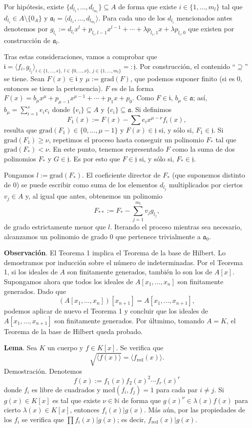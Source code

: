 \documentclass[a4paper,12pt]{article}
\newcommand{\N}{\mathbb{N}}
\newcommand{\af}{\mathfrak{a}}
\newcommand{\grad}{\text{grad}}
\begin{document}
Por hipótesis, existe $\{d_{l_1},\dots,d_{l_{m_l}}\}\subseteq A$ de forma que existe $i\in\{1,\dots,m_l\}$ tal que $d_{l_i}\in A\setminus\{0_A\}$ y $\af_l=\langle d_{l_1},\dots,d_{l_{m_l}}\rangle$. Para cada uno de los $d_{l_i}$ mencionados antes denotemos por $g_{l_i}:=d_{l_i}x^l+p_{l_i,l-1}x^{l-1}+\cdots+\lambda p_{l_i,1}x+\lambda p_{l_i,0}$ que existen por construcción de $\af_l$.

Tras estas consideraciones, vamos a comprobar que $\mathfrak{i}=\langle f_i,g_{l_j}\rangle_{i\in\{1,\dots,s\},\ l\in\{0,\dots,\nu\},\ j\in\{1,\dots,m_l\}}=:\mathfrak{j}$. Por construcción, el contenido ``$\supseteq$'' se tiene. Sean $F(x)\in\mathfrak{i}$ y $\mu:=\grad(F)$, que podemos suponer finito (si es $0$, entonces se tiene la pertenencia). $F$ es de la forma $F(x)=b_\mu x^\mu+p_{\mu-1}x^{\mu-1}+\cdots+p_1x+p_0$.
Como $F\in\mathfrak{i}$, $b_\mu\in\af$; así, $b_\mu=\sum_{i=1}^se_ic_i$ donde $\{e_i\}\subseteq A$ y $\{c_i\}\subseteq\af$. Si definimos$$F_1(x):=F(x)-\sum e_ix^{\mu-\nu}f_i(x),$$
resulta que $\grad(F_1)\in\{0,\dots,\mu-1\}$ y $F(x)\in\mathfrak{j}$ si, y sólo si, $F_1\in\mathfrak{j}$. Si $\grad(F_1)\ge\nu$, repetimos el proceso hasta conseguir un polinomio $F_{*}$ tal que $\grad(F_*)<\nu$. En este punto, tenemos representado $F$ como la suma de dos polinomios $F_*$ y $G\in\mathfrak{j}$. Es por esto que $F\in\mathfrak{j}$ si, y sólo si, $F_*\in\mathfrak{j}$.

Pongamos $l:=\grad(F_*)$. El coeficiente director de $F_*$ (que suponemos distinto de $0$) se puede escribir como suma de los elementos $d_{l_j}$ multiplicados por ciertos $v_j\in A$ y, al igual que antes, obtenemos un polinomio$$F_{**}:=F_*-\sum_{j=1}^{m_l}v_jg_{l_j},$$de grado estrictamente menor que $l$. Iterando el proceso mientras sea necesario, alcanzamos un polinomio de grado $0$ que pertenece trivialmente a $\af_0$.

\textbf{Observación}. El Teorema 1 implica el Teorema de la base de Hilbert. Lo demostramos por inducción sobre el número de indeterminadas. Por el Teorema 1, si los ideales de $A$ son finitamente generados, también lo son los de $A[x]$. Supongamos ahora que todos los ideales de $A[x_1,\dots,x_n]$ son finitamente generados. Dado que$$(A[x_1,\dots,x_n])[x_{n+1}]=A[x_1,\dots,x_{n+1}],$$podemos aplicar de nuevo el Teorema 1 y concluir que los ideales de $A[x_1,\dots,x_{n+1}]$ son finitamente generados. Por últmimo, tomando $A=K$, el Teorema de la base de Hilbert queda probado.

\textbf{Lema}. Sea $K$ un cuerpo y $f\in K[x]$. Se verifica que$$\sqrt{\langle f(x)\rangle}=\langle f_{\text{red}}(x)\rangle.$$
Demostración. Denotemos$$f(x):=f_1(x)f_2(x)^2\cdots f_r(x)^r$$donde $f_i$ es libre de cuadrados y $\text{mcd}(f_i,f_j)=1$ para cada par $i\neq j$. Si $g(x)\in K[x]$ es tal que existe $\nu\in\N$ de forma que $g(x)^\nu\in\lambda(x)f(x)$ para cierto $\lambda(x)\in K[x]$, entonces $f_i(x)|g(x)$. Más aún, por las propiedades de los $f_i$ se verifica que $\prod f_i(x)|g(x)$; es decir, $f_\text{red}(x)|g(x)$.
\end{document}
